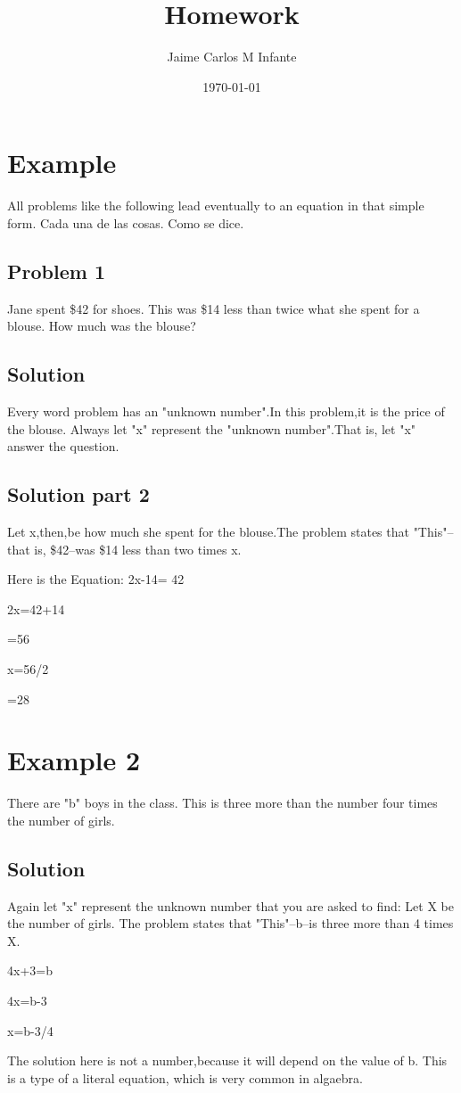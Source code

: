 \documentclass[12pt]{article}%
\begin{document}
\title{Homework}
\author{Jaime Carlos M Infante}
\date{\today}
\maketitle
\section{Example} 


        

All problems like the following lead eventually to an equation in that simple form.
Cada una de las cosas.
Como se dice.
 

\subsection{Problem 1}
Jane spent \$42 for shoes. This was \$14 less than twice what she spent for a blouse. How much was the blouse?
\subsection{Solution}
Every word problem has an "unknown number".In this problem,it is the price of the blouse. Always let "x" represent the "unknown number".That is, let "x" answer the question.
\subsection{Solution part 2}
Let x,then,be how much she spent for the blouse.The problem states that "This"--that is, \$42--was \$14 less than two times x.

           Here is the Equation: 2x-14= 42
                                 
                                 2x=42+14
                                 
                                 =56
                                 
                                 x=56/2
                                 
                                 =28





\section{Example 2}
There are "b" boys in the class. This is three more than the number four times the number of girls.
\subsection {Solution}
Again let "x" represent the unknown number that you are asked to find: Let X be the number of girls. The problem states that "This"--b--is three more than 4 times X. 
          
          4x+3=b
          
          4x=b-3
          
          x=b-3/4
          
 The solution here is not a number,because it will depend on the value of b. This is a type of a literal equation, which is very common in algaebra.
\end{document}
